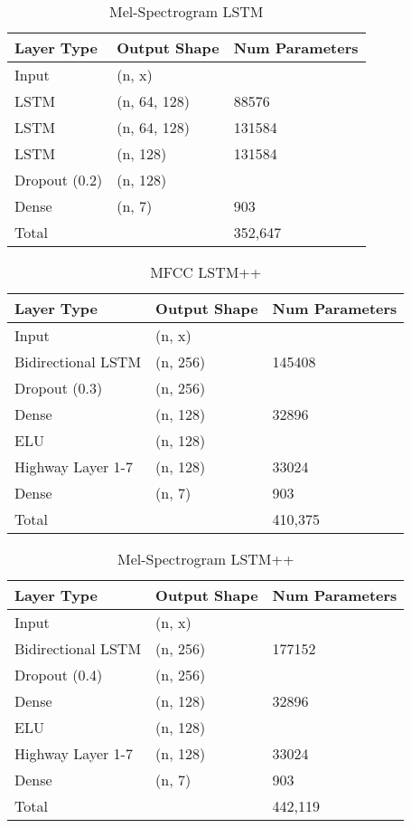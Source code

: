 \begin{table}[h]
\caption{Mel-Spectrogram LSTM}
\centering
\begin{tabular}{l|l|l}
Layer Type & Output Shape & Num Parameters \\ \hline
Input & (n, x) & \\
LSTM & (n, 64, 128) & 88576\\
LSTM & (n, 64, 128) & 131584\\
LSTM & (n, 128) & 131584\\
Dropout (0.2) & (n, 128) & \\
Dense   & (n, 7) & 903\\
\hline
\hline
Total   & \ & 352,647\\
\end{tabular}
\end{table}

\begin{table}[h]
\caption{MFCC LSTM++}
\centering
\begin{tabular}{l|l|l}
Layer Type & Output Shape & Num Parameters \\ \hline
Input & (n, x) & \\
Bidirectional LSTM & (n, 256) & 145408\\
Dropout (0.3) & (n, 256) & \\
Dense & (n, 128) & 32896\\
ELU & (n, 128) &\\
Highway Layer 1-7 & (n, 128) & 33024\\
Dense   & (n, 7) & 903\\
\hline
\hline
Total   & \ & 410,375\\
\end{tabular}
\end{table}

\begin{table}[h]
\caption{Mel-Spectrogram LSTM++}
\centering
\begin{tabular}{l|l|l}
Layer Type & Output Shape & Num Parameters \\ \hline
Input & (n, x) & \\
Bidirectional LSTM & (n, 256) & 177152\\
Dropout (0.4) & (n, 256) & \\
Dense & (n, 128) & 32896\\
ELU & (n, 128) &\\
Highway Layer 1-7 & (n, 128) & 33024\\
Dense   & (n, 7) & 903\\
\hline
\hline
Total   & \ & 442,119\\
\end{tabular}
\end{table}

